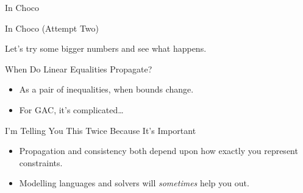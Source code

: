 \documentclass[aspectratio=169,compress,10pt]{beamer}
\begin{document}
\begin{frame}[t,fragile]{In Choco}
     {
        
    }
     {
        
    }
\end{frame}

\begin{frame}{In Choco (Attempt Two)}
     {
        Let's try some bigger numbers and see what happens.
        
    }
     {
        \begin{minipage}{0.47\paperwidth}
        \end{minipage}\begin{minipage}{0.44\paperwidth}
        \end{minipage}
    }
\end{frame}

\begin{frame}{When Do Linear Equalities Propagate?}
    \begin{itemize}
        \item As a pair of inequalities, when bounds change.
        \item For GAC, it's complicated\ldots
    \end{itemize}
\end{frame}

\begin{frame}{I'm Telling You This Twice Because It's Important}
    \begin{itemize}
        \item Propagation and consistency both depend upon how exactly you represent constraints.
        \item Modelling languages and solvers will \emph{sometimes} help you out.
    \end{itemize}
\end{frame}
\end{document}
